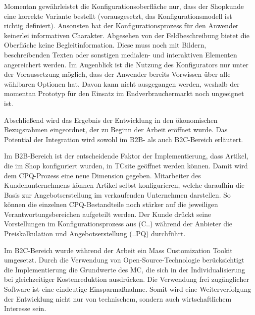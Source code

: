\documentclass[11pt, a4paper, titlepage, listof=totoc, bibliography=totoc, index=totoc, twoside, openright, headings=normal, draft]{scrreprt}
\begin{document}
Momentan gewährleistet die Konfigurationsoberfläche nur, dass der Shopkunde eine korrekte Variante bestellt (vorausgesetzt, das Konfigurationsmodell ist richtig definiert). Ansonsten hat der Konfigurationsprozess für den Anwender keinerlei informativen Charakter. Abgesehen von der Feldbeschreibung bietet die Oberfläche keine Begleitinformation. Diese muss noch mit Bildern, beschreibenden Texten oder sonstigen medialen- und interaktiven Elementen angereichert werden. Im Augenblick ist die Nutzung des Konfigurators nur unter der Voraussetzung möglich, dass der Anwender bereits Vorwissen über alle wählbaren Optionen hat. Davon kann nicht ausgegangen werden, weshalb der momentan Prototyp für den Einsatz im Endverbrauchermarkt noch ungeeignet ist.

Abschließend wird das Ergebnis der Entwicklung in den ökonomischen Bezugsrahmen eingeordnet, der zu Beginn der Arbeit eröffnet wurde. Das Potential der Integration wird sowohl im B2B- als auch B2C-Bereich erläutert.

Im B2B-Bereich ist der entscheidende Faktor der Implementierung, dass Artikel, die im Shop konfiguriert wurden, in TCsite geöffnet werden können. Damit wird dem CPQ-Prozess eine neue Dimension gegeben. Mitarbeiter des Kundenunternehmens können Artikel selbst konfigurieren, welche daraufhin die Basis zur Angebotserstellung im verkaufenden Unternehmen darstellen. So können die einzelnen CPQ-Bestandteile noch stärker auf die jeweiligen Verantwortungsbereichen aufgeteilt werden. Der Kunde drückt seine Vorstellungen im Konfigurationsprozess aus (C..) während der Anbieter die Preiskalkulation und Angebotserstellung (..PQ) durchführt.

Im B2C-Bereich wurde während der Arbeit ein Mass Customization Tookit umgesetzt. Durch die Verwendung von Open-Source-Technologie berücksichtigt die Implementierung die Grundwerte des \ac{MC}, die sich in der Individualisierung bei gleichzeitiger Kostenreduktion ausdrücken. Die Verwendung frei zugänglicher Software ist eine eindeutige Einsparmaßnahme. Somit wird eine Weiterverfolgung der Entwicklung nicht nur von technischem, sondern auch wirtschaftlichem Interesse sein.

\pagebreak






\end{document}
